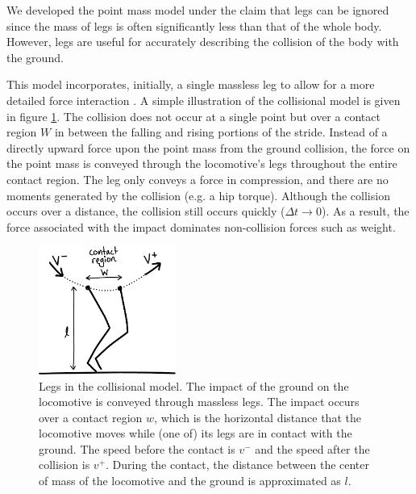 We developed the point mass model under the claim that legs can be ignored since the mass of legs is often significantly less than that of the whole body. However, legs are useful for accurately describing the collision of the body with the ground.


This model incorporates, initially, a single massless leg to allow for a more detailed force interaction \cite{ruina05}. A simple illustration of the collisional model is given in figure \ref{fig:LegDiagram}. The collision does not occur at a single point but over a contact region $W$ in between the falling and rising portions of the stride. Instead of a directly upward force upon the point mass from the ground collision, the force on the point mass is conveyed through the locomotive's legs throughout the entire contact region. The leg only conveys a force in compression, and there are no moments generated by the collision (e.g. a hip torque). Although the collision occurs over a distance, the collision still occurs quickly ($\Delta t \rightarrow 0$). As a result, the force associated with the impact dominates non-collision forces such as weight.

\begin{figure}[h]		%
\begin{centering}
\includegraphics[width=0.4\textwidth]{Figures/LegDiagram}\par
\end{centering}
\caption[Diagram: Legs in the Collisional Model]{Legs in the collisional model. The impact of the ground on the locomotive is conveyed through massless legs. The impact occurs over a contact region $w$, which is the horizontal distance that the locomotive moves while (one of) its legs are in contact with the ground. The speed before the contact is $v^{-}$ and the speed after the collision is $v^{+}$. During the contact, the distance between the center of mass of the locomotive and the ground is approximated as $l$.}
\label{fig:LegDiagram}
\end{figure}
%

